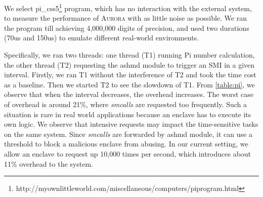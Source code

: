 \documentclass[journal,twocolumn,letterpaper,10pt]{IEEEtran}
\begin{document}
We select  pi\_css5\footnote{http://myownlittleworld.com/miscellaneous/computers/piprogram.html} program, which has no interaction with the external system, to measure the performance of \textsc{Aurora} with as little noise as possible. We ran the program till achieving 4,000,000 digits of precision, and used two durations (70us and 150us) to emulate different real-world environments.

Specifically, we ran two threads: one thread (T1) running Pi number calculation, the other thread (T2) requesting the ashmd module to trigger an SMI in a given interval. Firstly, we ran T1 without the interference of T2 and took the time cost as a baseline. Then we started T2 to see the slowdown of T1. From \autoref{table:pi}, we observe that when the interval decreases, the overhead increases. The worst case of overhead is around 21\%, where \textit{smcalls} are requested too frequently. Such a situation is rare in real world applications because an enclave has to execute its own logic. We observe that intensive requests may impact the time-sensitive tasks on the same system. Since \textit{smcalls} are forwarded by ashmd module, it can use a threshold to block a malicious enclave from abusing. In our current setting, we allow an enclave to request up 10,000 times per second, which introduces about 11\% overhead to the system.
\end{document}

